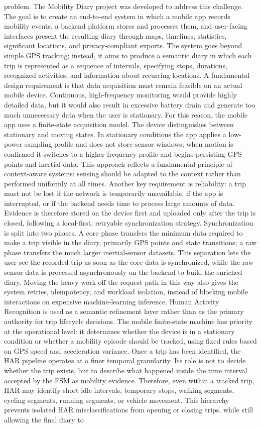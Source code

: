 \documentclass[conference,a4paper]{IEEEtran}
\begin{document}
problem.  The Mobility Diary project was developed to address this challenge. The goal is to create an end-to-end system in which a mobile app records mobility events, a backend platform stores and processes them, and user-facing interfaces present the resulting diary through maps, timelines, statistics, significant locations, and privacy-compliant exports. The system goes beyond simple GPS tracking; instead, it aims to produce a semantic diary in which each trip is represented as a sequence of intervals, specifying stops, durations, recognized activities, and information about recurring locations.  A fundamental design requirement is that data acquisition must remain feasible on an actual mobile device. Continuous, high-frequency monitoring would provide highly detailed data, but it would also result in excessive battery drain and generate too much unnecessary data when the user is stationary. For this reason, the mobile app uses a finite-state acquisition model. The device distinguishes between stationary and moving states. In stationary conditions the app applies a low-power sampling profile and does not store sensor windows; when motion is confirmed it switches to a higher-frequency profile and begins persisting GPS points and inertial data. This approach reflects a fundamental principle of context-aware systems: sensing should be adapted to the context rather than performed uniformly at all times.  Another key requirement is reliability: a trip must not be lost if the network is temporarily unavailable, if the app is interrupted, or if the backend needs time to process large amounts of data. Evidence is therefore stored on the device first and uploaded only after the trip is closed, following a local-first, retryable synchronization strategy. Synchronization is split into two phases. A core phase transfers the minimum data required to make a trip visible in the diary, primarily GPS points and state transitions; a raw phase transfers the much larger inertial-sensor datasets. This separation lets the user see the recorded trip as soon as the core data is synchronized, while the raw sensor data is processed asynchronously on the backend to build the enriched diary. Moving the heavy work off the request path in this way also gives the system retries, idempotency, and workload isolation, instead of blocking mobile interactions on expensive machine-learning inference.  Human Activity Recognition is used as a semantic refinement layer rather than as the primary authority for trip lifecycle decisions. The mobile finite-state machine has priority at the operational level: it determines whether the device is in a stationary condition or whether a mobility episode should be tracked, using fixed  rules based on GPS speed and acceleration variance. Once a trip has been identified, the HAR pipeline operates at a finer temporal granularity. Its role is not to decide whether the trip exists, but to describe what happened inside the time interval accepted by the FSM as mobility evidence. Therefore, even within a tracked trip, HAR may identify short idle intervals, temporary stops, walking segments, cycling segments, running segments, or vehicle movement. This hierarchy prevents isolated HAR misclassifications from opening or closing trips, while still allowing the final diary to 
\end{document}
